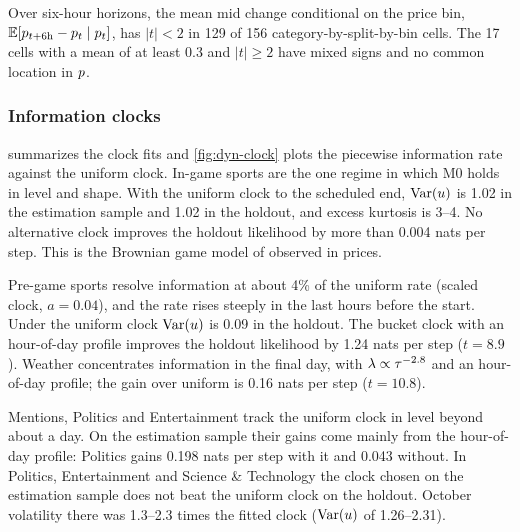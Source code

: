 Over six-hour horizons, the mean mid change conditional on the price bin,
  $\mathbb{E}[p_{t+6\text{h}}-p_t\mid p_t]$, has $|t|<2$ in 129 of 156 category-by-split-by-bin cells.
  The 17 cells with a mean of at least 0.3\cents{} and $|t|\ge2$ have mixed signs and no common
  location in $p$.

\subsubsection{Information clocks}\label{sec:dyn-res-clock}

 summarizes the clock fits and \cref{fig:dyn-clock} plots the piecewise
information rate against the uniform clock.
In-game sports are the one regime in which M0 holds in level and shape. With the
  uniform clock to the scheduled end, $\operatorname{Var}(u)$ is 1.02 in the estimation sample and 1.02 in the
  holdout, and excess kurtosis is 3--4. No alternative clock improves the holdout likelihood by more
  than 0.004 nats per step. This is the Brownian game model of \citet{stern1994} observed in prices.

Pre-game sports resolve information at about 4\% of the uniform rate (scaled clock,
  $a=0.04$), and the rate rises steeply in the last hours before the start. Under the uniform clock
  $\operatorname{Var}(u)$ is 0.09 in the holdout. The bucket clock with an hour-of-day profile improves the
  holdout likelihood by 1.24 nats per step ($t=8.9$).
Weather concentrates information in the final day, with $\lambda\propto\tau^{-2.8}$
  and an hour-of-day profile; the gain over uniform is 0.16 nats per step ($t=10.8$).

Mentions, Politics and Entertainment track the uniform clock in level beyond about a
  day. On the estimation sample their gains come mainly from the hour-of-day profile: Politics gains
  0.198 nats per step with it and 0.043 without.
In Politics, Entertainment and Science \& Technology the clock
  chosen on the estimation sample does not beat the uniform clock on the holdout. October volatility
  there was 1.3--2.3 times the fitted clock ($\operatorname{Var}(u)$ of 1.26--2.31).

